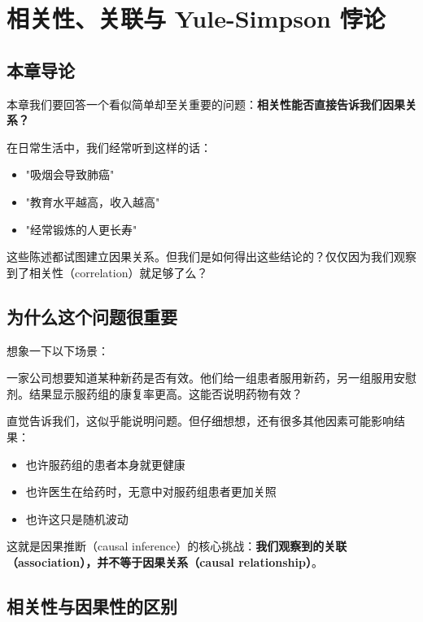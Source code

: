 
\chapter{相关性、关联与 Yule-Simpson 悖论}\label{ch:1}

\section{本章导论}

本章我们要回答一个看似简单却至关重要的问题：\textbf{相关性能否直接告诉我们因果关系？}

在日常生活中，我们经常听到这样的话：
\begin{itemize}
  \item "吸烟会导致肺癌"
  \item "教育水平越高，收入越高"
  \item "经常锻炼的人更长寿"
\end{itemize}

这些陈述都试图建立因果关系。但我们是如何得出这些结论的？仅仅因为我们观察到了相关性（correlation）就足够了么？

\section{为什么这个问题很重要}

想象一下以下场景：

\begin{Example}
一家公司想要知道某种新药是否有效。他们给一组患者服用新药，另一组服用安慰剂。结果显示服药组的康复率更高。这能否说明药物有效？
\end{Example}

直觉告诉我们，这似乎能说明问题。但仔细想想，还有很多其他因素可能影响结果：
\begin{itemize}
  \item 也许服药组的患者本身就更健康
  \item 也许医生在给药时，无意中对服药组患者更加关照
  \item 也许这只是随机波动
\end{itemize}

这就是因果推断（causal inference）的核心挑战：\textbf{我们观察到的关联（association），并不等于因果关系（causal relationship）}。

\section{相关性与因果性的区别}

